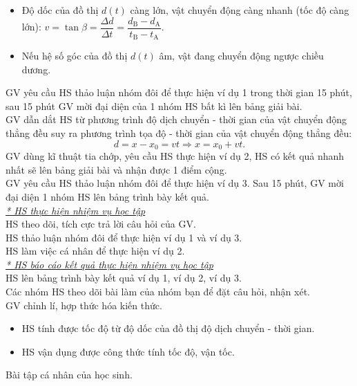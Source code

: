 {\begin{itemize}
\begin{center}
	\end{center}
	\begin{itemize}
		\item Độ dốc của đồ thị $d\left(t\right)$ càng lớn, vật chuyển động càng nhanh (tốc độ càng lớn): $v=\tan\beta=\dfrac{\Delta d}{\Delta t}=\dfrac{d_{\mathrm{B}}-d_{\mathrm{A}}}{t_{\mathrm{B}}-t_{\mathrm{A}}}$.
		\item Nếu hệ số góc của đồ thị $d\left(t\right)$ âm, vật đang chuyển động ngược chiều dương.
	\end{itemize}
\end{itemize}
GV yêu cầu HS thảo luận nhóm đôi để thực hiện ví dụ 1 trong thời gian 15 phút, sau 15 phút GV mời đại diện của 1 nhóm HS bất kì lên bảng giải bài.\\
GV dẫn dắt HS từ phương trình độ dịch chuyển - thời gian của vật chuyển động thẳng đều suy ra phương trình tọa độ - thời gian của vật chuyển động thẳng đều:
 $$d=x-x_0=vt\Rightarrow x=x_0+vt.$$
 GV dùng kĩ thuật tia chớp, yêu cầu HS thực hiện ví dụ 2, HS có kết quả nhanh nhất sẽ lên bảng giải bài và nhận được 1 điểm cộng.\\
 GV yêu cầu HS thảo luận nhóm đôi để thực hiện ví dụ 3. Sau 15 phút, GV mời đại diện 1 nhóm HS lên bảng trình bày kết quả. \\
 \textit{\underline{* HS thực hiện nhiệm vụ học tập}}\\
 HS theo dõi, tích cực trả lời câu hỏi của GV.\\
 HS thảo luận nhóm đôi để thực hiện ví dụ 1 và ví dụ 3.\\
 HS làm việc cá nhân để thực hiện ví dụ 2.\\
 \textit{\underline{* HS báo cáo kết quả thực hiện nhiệm vụ học tập}}\\
 HS lên bảng trình bày kết quả ví dụ 1, ví dụ 2, ví dụ 3.\\
 Các nhóm HS theo dõi bài làm của nhóm bạn để đặt câu hỏi, nhận xét.\\
 GV chỉnh lí, hợp thức hóa kiến thức.
 
}
{
\begin{itemize}
	\item HS tính được tốc độ từ độ dốc của đồ thị độ dịch chuyển - thời gian.
	\item HS vận dụng được công thức tính tốc độ, vận tốc.
\end{itemize}
}
{
	Bài tập cá nhân của học sinh.
}
